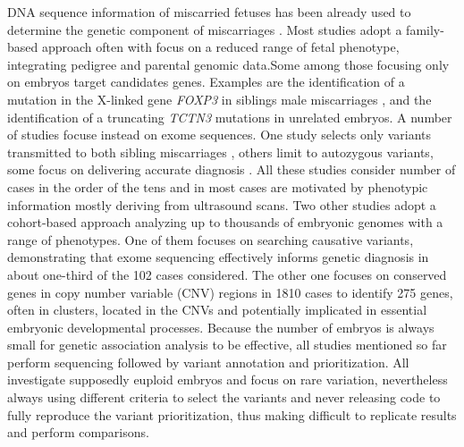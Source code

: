 DNA sequence information of miscarried fetuses has been already used to determine the genetic component of miscarriages \cite{rajcan2020next, filges2015exome}. Most studies adopt a family-based approach often with focus on a reduced range of fetal phenotype, integrating pedigree and parental genomic data\cite{bondeson2017nonsense, dohrn2015ecel1,wilbe2015musk, cristofoli2017novel}.Some among those focusing only on embryos target candidates genes. Examples are the identification of a mutation in the X-linked gene \textit{FOXP3} in siblings male miscarriages \cite{rae2015novel}, and the identification of a truncating \textit{TCTN3} mutations in unrelated embryos\cite{thomas2012tctn3}. A number of studies focuse instead on exome sequences\cite{shamseldin2015identification, qiao2016whole,fu2018whole, meier2019exome, yates2017whole}. One study selects only variants transmitted to both sibling miscarriages \cite{qiao2016whole}, others limit to autozygous variants\cite{thomas2012tctn3, shamseldin2015identification}, some focus on delivering accurate diagnosis \cite{meier2019exome}. All these studies consider number of cases in the order of the tens and in most cases are motivated by phenotypic information mostly deriving from ultrasound scans. 
Two other studies adopt a cohort-based approach analyzing up to thousands of embryonic genomes with a range of phenotypes\cite{chen2017characterization,zhao2020exome}. One of them focuses on  searching causative variants, demonstrating that exome sequencing effectively informs genetic diagnosis in about one-third of the 102 cases considered\cite{zhao2020exome}. The other one focuses on conserved genes in copy number variable (CNV) regions in 1810 cases to identify 275 genes, often in clusters, located in the CNVs and potentially implicated in essential embryonic developmental processes\cite{chen2017characterization}.
Because the number of embryos is always small for genetic association analysis to be effective, all studies mentioned so far perform sequencing followed by variant annotation and prioritization. All investigate supposedly euploid embryos and focus on rare variation, nevertheless always using different criteria to select the variants and never releasing code to fully reproduce the variant prioritization, thus making difficult to replicate results and perform comparisons.  


